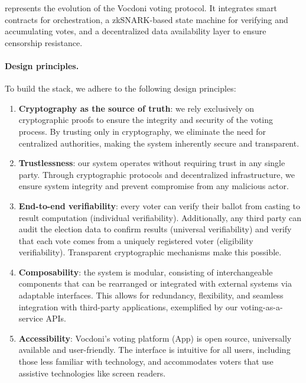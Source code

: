 

\Davinci represents the evolution of the Vocdoni voting protocol. It integrates smart contracts for orchestration, a zkSNARK-based state machine for verifying and accumulating votes, and a decentralized data availability layer to ensure censorship resistance.

\paragraph{Design principles.}

To build the \davinci stack, we adhere to the following design principles:

\begin{enumerate}
	\item \textbf{Cryptography as the source of truth}: we rely exclusively on cryptographic proofs to ensure the integrity and security of the voting process. By trusting only in cryptography, we eliminate the need for centralized authorities, making the system inherently secure and transparent.
	
	\item \textbf{Trustlessness}: our system operates without requiring trust in any single party. Through cryptographic protocols and decentralized infrastructure, we ensure system integrity and prevent compromise from any malicious actor.
	
	\item \textbf{End-to-end verifiability}: every voter can verify their ballot from casting to result computation (individual verifiability). Additionally, any third party can audit the election data to confirm results (universal verifiability) and verify that each vote comes from a uniquely registered voter (eligibility verifiability). Transparent cryptographic mechanisms make this possible.
	
	\item \textbf{Composability}: the system is modular, consisting of interchangeable components that can be rearranged or integrated with external systems via adaptable interfaces. This allows for redundancy, flexibility, and seamless integration with third-party applications, exemplified by our voting-as-a-service APIs.
	
	\item \textbf{Accessibility}: Vocdoni’s voting platform (App) is open source, universally available and user-friendly. The interface is intuitive for all users, including those less familiar with technology, and accommodates voters that use assistive technologies like screen readers.
	

\end{enumerate}
